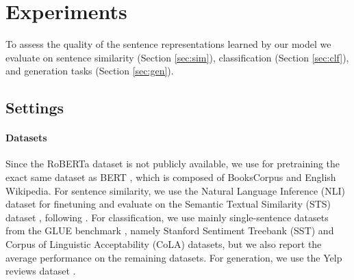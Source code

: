 
\section{Experiments}\label{sec:experiments}
To assess the quality of the sentence representations learned by our model we evaluate on sentence similarity (Section \ref{sec:sim}), classification (Section \ref{sec:clf}), and generation tasks (Section \ref{sec:gen}).


\subsection{Settings} 
\paragraph{Datasets}
Since the RoBERTa dataset is not publicly available, we use for pretraining the exact same dataset as BERT \citep{devlin-etal-2019-bert}, which is composed of BooksCorpus \citep{zhu2015aligning} and English Wikipedia. For sentence similarity, we use the Natural Language Inference (NLI) dataset \citep{bowman2015snli} for finetuning and evaluate on the Semantic Textual Similarity (STS) dataset \citep{cer2017semeval}, following \citet{conneau2017supervised}.  For classification, we use mainly single-sentence datasets from the GLUE benchmark \citep{wang2018glue}, namely Stanford Sentiment Treebank (SST) and Corpus of Linguistic Acceptability (CoLA) datasets, but we also report the average performance on the remaining datasets. For generation, we use the Yelp reviews dataset \citep{shen2017style}.




